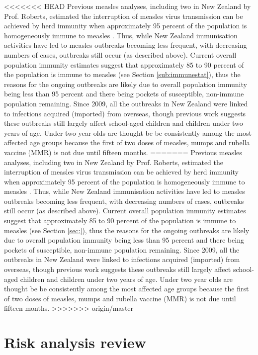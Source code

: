 \documentclass{article}
\begin{document}
\begin{itemize}
<<<<<<< HEAD
Previous measles analyses, including two in New Zealand by Prof. Roberts, estimated the interruption of measles virus transmission can be achieved by herd immunity when approximately 95 percent of the population is homogeneously immune to measles \citep{roberts0,roberts4}. Thus, while New Zealand immunisation activities have led to measles outbreaks becoming less frequent, with decreasing numbers of cases, outbreaks still occur (as described above). Current overall population immunity estimates suggest that approximately 85 to 90 percent of the population is immune to measles (see Section \ref{sub:immunestat}), thus the reasons for the ongoing outbreaks are likely due to overall population immunity being less than 95 percent and there being pockets of susceptible, non-immune population remaining. Since 2009, all the outbreaks in New Zealand were linked to infections acquired (imported) from overseas, though previous work suggests these outbreaks still largely affect school-aged children and children under two years of age. Under two year olds are thought be be consistently among the most affected age groups because the first of two doses of measles, mumps and rubella vaccine (MMR) is not due until fifteen months.
=======
Previous measles analyses, including two in New Zealand by Prof. Roberts, estimated the interruption of measles virus transmission can be achieved by herd immunity when approximately 95 percent of the population is homogeneously immune to measles \citep{roberts0,roberts4}. Thus, while New Zealand immunisation activities have led to measles outbreaks becoming less frequent, with decreasing numbers of cases, outbreaks still occur (as described above). Current overall population immunity estimates suggest that approximately 85 to 90 percent of the population is immune to measles (see Section \ref{sec:}), thus the reasons for the ongoing outbreaks are likely due to overall population immunity being less than 95 percent and there being pockets of susceptible, non-immune population remaining. Since 2009, all the outbreaks in New Zealand were linked to infections acquired (imported) from overseas, though previous work suggests these outbreaks still largely affect school-aged children and children under two years of age. Under two year olds are thought be be consistently among the most affected age groups because the first of two doses of measles, mumps and rubella vaccine (MMR) is not due until fifteen months.
>>>>>>> origin/master

\section{Risk analysis review}


\end{itemize}
\end{document}
